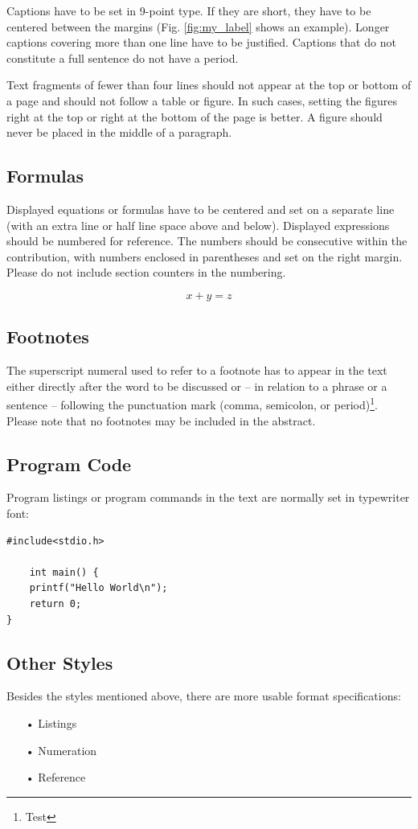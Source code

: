 Captions have to be set in 9-point type. If they are short, they have to be centered between the margins (Fig. \ref{fig:my_label} shows an example). Longer captions covering more than one line have to be justified. Captions that do not constitute a full sentence do not have a period.

Text fragments of fewer than four lines should not appear at the top or bottom of a page and should not follow a table or figure. In such cases, setting the figures right at the top or right at the bottom of the page is better. A figure should never be placed in the middle of a paragraph.

\subsection{Formulas}
Displayed equations or formulas have to be centered and set on a separate line (with an extra line or half line space above and below). Displayed expressions should be numbered for reference. The numbers should be consecutive within the contribution, with numbers enclosed in parentheses and set on the right margin. Please do not include section counters in the numbering.

\begin{equation}
    x + y = z
\end{equation}

\subsection{Footnotes}
The superscript numeral used to refer to a footnote has to appear in the text either directly after the word to be discussed or – in relation to a phrase or a sentence – following the punctuation mark (comma, semicolon, or period)\footnote{Test}.  
Please note that no footnotes may be included in the abstract.

\subsection{Program Code}
Program listings or program commands in the text are normally set in typewriter font: 

\begin{lstlisting}
#include<stdio.h>

    int main() {
	printf("Hello World\n");
	return 0;
}
\end{lstlisting}

\subsection{Other Styles}
Besides the styles mentioned above, there are more usable format specifications:
\begin{itemize}
    \item[•] Listings
    \item[•] Numeration
    \item[•] Reference 
\end{itemize}

